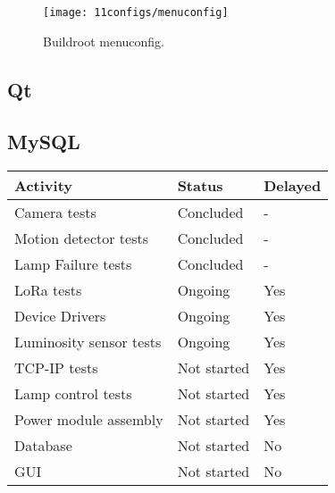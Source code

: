 \begin{figure}[H]
	\centering	
	\texttt{[image: 11configs/menuconfig]}
	\caption{Buildroot menuconfig.}
	\label{fig:menuconfig}
\end{figure}

\subsection{Qt}

\subsection{MySQL}

\begin{table}[H]
	\centering
	\begin{tabular}{|m{8cm}|m{}|m{2cm}|}
		\hline
		\textbf{Activity} & \textbf{Status} & \textbf{Delayed}
		\\\hline\hline
		Camera tests & Concluded & -\\\hline
		Motion detector tests & Concluded & -\\\hline
		Lamp Failure tests & Concluded & -\\\hline
		
		LoRa tests & Ongoing & Yes\\\hline
		Device Drivers & Ongoing & Yes\\\hline
		Luminosity sensor tests & Ongoing & Yes\\\hline
		
		TCP-IP tests & Not started & Yes\\\hline
		Lamp control tests & Not started & Yes\\\hline		
		Power module assembly & Not started & Yes\\\hline
		Database & Not started & No\\\hline
		GUI & Not started & No		
		\\\hline
	\end{tabular}
	
\end{table}



